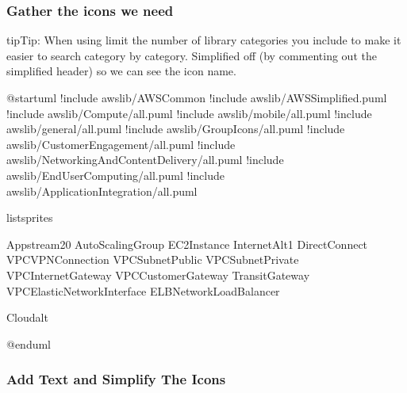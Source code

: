 \documentclass[letterpaper,10pt,english]{sphinxmanual}
\begin{document}
\subsubsection{Gather the icons we need}
\label{\detokenize{aws/aws:id15}}
\begin{sphinxadmonition}{tip}{Tip:}
When using  limit the number of library categories you include to make it easier to search category by category.
Simplified off (by commenting out the simplified header) so we can see the icon name.
\end{sphinxadmonition}

\begin{figure}[htbp]
\centering

\end{figure}

\begin{sphinxVerbatim}[commandchars=\\\{\},numbers=left,firstnumber=1,stepnumber=1]
@startuml
!include \PYGZlt{}awslib/AWSCommon\PYGZgt{}
!include \PYGZlt{}awslib/AWSSimplified.puml\PYGZgt{}
\PYGZsq{}!include \PYGZlt{}awslib/Compute/all.puml\PYGZgt{}
\PYGZsq{}!include \PYGZlt{}awslib/mobile/all.puml\PYGZgt{}
\PYGZsq{}!include \PYGZlt{}awslib/general/all.puml\PYGZgt{}
!include \PYGZlt{}awslib/GroupIcons/all.puml\PYGZgt{}
!include \PYGZlt{}awslib/CustomerEngagement/all.puml\PYGZgt{}
!include \PYGZlt{}awslib/NetworkingAndContentDelivery/all.puml\PYGZgt{}
!include \PYGZlt{}awslib/EndUserComputing/all.puml\PYGZgt{}
!include \PYGZlt{}awslib/ApplicationIntegration/all.puml\PYGZgt{}

listsprites

\PYGZsq{}Appstream2\PYGZus{}0
\PYGZsq{}AutoScalingGroup
\PYGZsq{}EC2Instance
\PYGZsq{}InternetAlt1
\PYGZsq{}DirectConnect
\PYGZsq{}VPCVPNConnection
\PYGZsq{}VPCSubnetPublic
\PYGZsq{}VPCSubnetPrivate
\PYGZsq{}VPCInternetGateway
\PYGZsq{}VPCCustomerGateway
\PYGZsq{}TransitGateway
\PYGZsq{}VPCElasticNetworkInterface
\PYGZsq{}ELBNetworkLoadBalancer

\PYGZsq{}Cloudalt

@enduml
\end{sphinxVerbatim}


\subsubsection{Add Text and Simplify The Icons}
\label{\detokenize{aws/aws:add-text-and-simplify-the-icons}}
\begin{figure}[htbp]
\centering

\end{figure}
\end{document}
